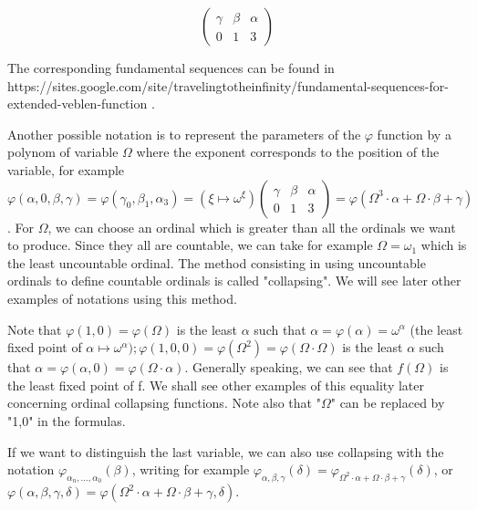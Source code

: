 \documentclass[10pt]{article}
\begin{document}
\[
  \begin{pmatrix}
    \gamma & \beta & \alpha \\
    0 & 1 & 3
  \end{pmatrix}
\]

The corresponding fundamental sequences can be found in https://sites.google.com/site/travelingtotheinfinity/fundamental-sequences-for-extended-veblen-function .

\bigskip

Another possible notation is to represent the parameters of the \( \varphi \) function by a polynom of variable \( \Omega \) where the exponent corresponds to the position of the variable, for example \( \varphi(\alpha,0,\beta,\gamma) = \varphi(\gamma_0,\beta_1,\alpha_3) = (\xi \mapsto \omega^\xi) \begin{pmatrix} \gamma & \beta & \alpha \\ 0 & 1 & 3 \end{pmatrix} = \varphi(\Omega^3 \cdot \alpha + \Omega \cdot \beta + \gamma) \). For \( \Omega \), we can choose an ordinal which is greater than all the ordinals we want to produce. Since they all are countable, we can take for example \( \Omega = \omega_1 \) which is the least uncountable ordinal. The method consisting in using uncountable ordinals to define countable ordinals is called "collapsing". We will see later other examples of notations using this method.

Note that \( \varphi(1,0) = \varphi(\Omega) \) is the least \( \alpha \) such that \( \alpha = \varphi(\alpha) = \omega^\alpha \) (the least fixed point of \( \alpha \mapsto \omega^\alpha) ; \varphi(1,0,0) = \varphi(\Omega^2) = \varphi(\Omega \cdot \Omega) \) is the least \( \alpha \) such that \( \alpha = \varphi(\alpha,0) = \varphi(\Omega \cdot \alpha) \). Generally speaking, we can see that \( f(\Omega) \) is the least fixed point of f. We shall see other examples of this equality later concerning ordinal collapsing functions. Note also that "\(\Omega\)" can be replaced by "1,0" in the formulas.

\bigskip

If we want to distinguish the last variable, we can also use collapsing with the notation \( \varphi_{\alpha_n,\ldots,\alpha_0}(\beta) \), writing for example \( \varphi_{\alpha,\beta,\gamma}(\delta) = \varphi_{\Omega^2 \cdot \alpha + \Omega \cdot \beta + \gamma}(\delta) \), or \( \varphi(\alpha,\beta,\gamma,\delta) = \varphi(\Omega^2 \cdot \alpha + \Omega \cdot \beta + \gamma, \delta) \).
\end{document}
